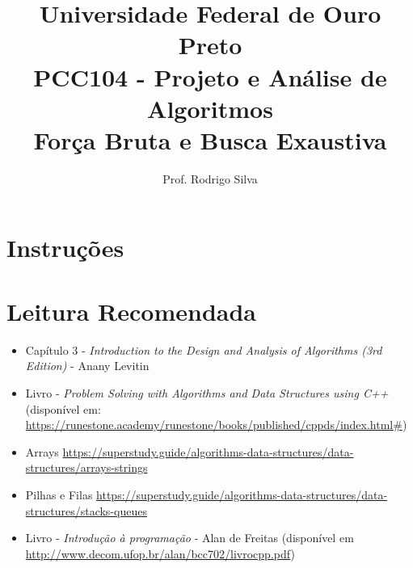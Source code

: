 \documentclass{article}
\title{\vspace{-2 cm}Universidade Federal de Ouro Preto \\ PCC104 - Projeto e Análise de Algoritmos \\ Força Bruta e Busca Exaustiva}
\author{Prof. Rodrigo Silva}
\begin{document}
\maketitle

\section*{Instruções}




\section{Leitura Recomendada}

\begin{itemize}
    \item Capítulo 3 - \textit{Introduction to the Design and Analysis of Algorithms (3rd Edition)} - Anany Levitin 
    \item Livro - \textit{Problem Solving with Algorithms and Data Structures using C++} (disponível em: \url{https://runestone.academy/runestone/books/published/cppds/index.html#})
    \item Arrays \url{https://superstudy.guide/algorithms-data-structures/data-structures/arrays-strings}
    \item Pilhas e Filas \url{https://superstudy.guide/algorithms-data-structures/data-structures/stacks-queues}
    \item Livro - \textit{Introdução à programação} - Alan de Freitas (disponível em \url{http://www.decom.ufop.br/alan/bcc702/livrocpp.pdf})
\end{itemize}
\end{document}
